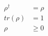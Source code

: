 \begin{equation}\label{eqn:rho_prop}
\begin{split}
    \rho^\dag &= \rho \\
    tr(\rho) & = 1 \\
    \rho & \geqslant 0
\end{split}
\end{equation}
